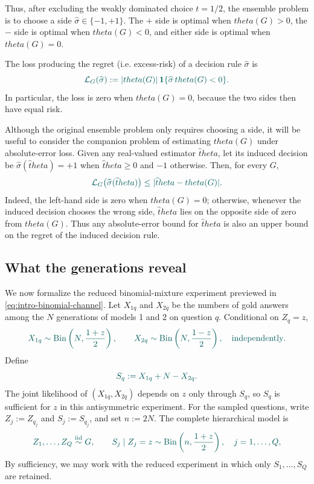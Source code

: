 \documentclass[11pt]{article}
\def\theta{theta}%
\newcommand{\one}{\mathbf 1}
\newcommand{\Bin}{\operatorname{Bin}}
\newcommand\aed[1]{{\color{magenta!60!black} #1}}
\newcommand\ced[1]{{\color{teal!70!black} #1}}
\begin{document}
Thus, after excluding the weakly dominated choice $t=1/2$, the ensemble problem is to choose a side $\widehat\sigma\in\{-1,+1\}$.  The $+$ side is optimal when $\theta(G)>0$, the $-$ side is optimal when $\theta(G)<0$, and either side is optimal when $\theta(G)=0$.  %

\aed{The loss producing the regret (i.e. excess-risk)} of a decision rule $\widehat\sigma$ is
\begin{equation}
\label{eq:scalar-decision-loss}
\ced{\mathcal L_G(\widehat\sigma)
:=
|\theta(G)|\,
\one\{\widehat\sigma\,\theta(G)<0\}.}
\end{equation}
\ced{In particular, the loss is zero when $\theta(G)=0$, because the two sides then have equal risk.}

\ced{Although the original ensemble problem only requires choosing a side, it will be useful to consider the companion problem of estimating $\theta(G)$ under absolute-error loss.  Given any real-valued estimator $\widehat\theta$, let its induced decision be $\widehat\sigma(\widehat\theta)=+1$ when $\widehat\theta\ge0$ and $-1$ otherwise.}
\ced{Then, for every $G$,}
\begin{equation}
\label{eq:pointwise-decision-reduction}
\ced{\mathcal L_G\bigl(\widehat\sigma(\widehat\theta)\bigr)
\le
|\widehat\theta-\theta(G)|.}
\end{equation}
Indeed, the left-hand side is zero when $\theta(G)=0$; otherwise, whenever the induced decision chooses the wrong side, $\widehat\theta$ lies on the opposite side of zero from $\theta(G)$.  \ced{Thus any absolute-error bound for $\widehat\theta$ is also an upper bound on the regret of the induced decision rule.}  %

\subsection{What the generations reveal}

\ced{We now formalize the reduced binomial-mixture experiment previewed in \eqref{eq:intro-binomial-channel}.  Let $X_{1q}$ and $X_{2q}$ be the numbers of gold answers among the $N$ generations of models 1 and 2 on question $q$.  Conditional on $Z_q=z$,}
\[
\ced{X_{1q}\sim\Bin\left(N,\frac{1+z}{2}\right),
\qquad
X_{2q}\sim\Bin\left(N,\frac{1-z}{2}\right),
\quad\text{independently}.}
\]
\ced{Define}
\begin{equation}
\label{eq:S-stat}
\ced{S_q:=X_{1q}+N-X_{2q}.}
\end{equation}
\ced{The joint likelihood of $(X_{1q},X_{2q})$ depends on $z$ only through $S_q$, so $S_q$ is sufficient for $z$ in this antisymmetric experiment.  For the sampled questions, write $Z_j:=Z_{q_j}$ and $S_j:=S_{q_j}$, and set $n:=2N$.  The complete hierarchical model is}
\begin{equation}
\label{eq:scalar-reduced-experiment}
\ced{Z_1,\dots,Z_Q\overset{\mathrm{iid}}{\sim}G,
\qquad
S_j\mid Z_j=z
\sim
\Bin\left(n,\frac{1+z}{2}\right),
\quad j=1,\dots,Q,}
\end{equation}
\ced{By sufficiency, we may work with the reduced experiment in which only $S_1,\dots,S_Q$ are retained.}
\end{document}
